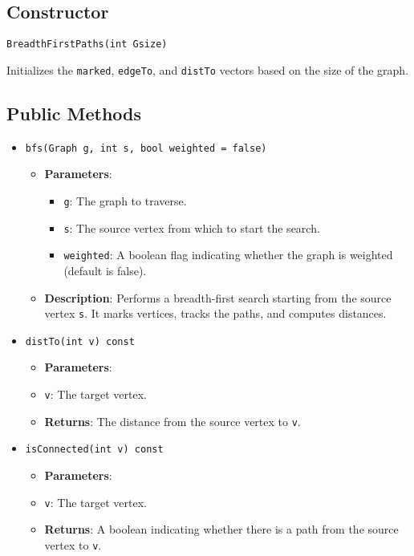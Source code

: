 \documentclass{article}
\begin{document}
\subsection{Constructor}
\begin{verbatim}
BreadthFirstPaths(int Gsize)
\end{verbatim}
Initializes the \texttt{marked}, \texttt{edgeTo}, and \texttt{distTo} vectors based on the size of the graph.

\subsection{Public Methods}
\begin{itemize}
    \item \texttt{bfs(Graph g, int s, bool weighted = false)}
    \begin{itemize}
        \item \textbf{Parameters}:
        \begin{itemize}
            \item \texttt{g}: The graph to traverse.
            \item \texttt{s}: The source vertex from which to start the search.
            \item \texttt{weighted}: A boolean flag indicating whether the graph is weighted (default is false).
        \end{itemize}
        \item \textbf{Description}: Performs a breadth-first search starting from the source vertex \texttt{s}. It marks vertices, tracks the paths, and computes distances.
    \end{itemize}

    \item \texttt{distTo(int v) const}
    \begin{itemize}
        \item \textbf{Parameters}:
        \item \texttt{v}: The target vertex.
        \item \textbf{Returns}: The distance from the source vertex to \texttt{v}.
    \end{itemize}

    \item \texttt{isConnected(int v) const}
    \begin{itemize}
        \item \textbf{Parameters}:
        \item \texttt{v}: The target vertex.
        \item \textbf{Returns}: A boolean indicating whether there is a path from the source vertex to \texttt{v}.
    \end{itemize}


\end{itemize}
\end{document}
